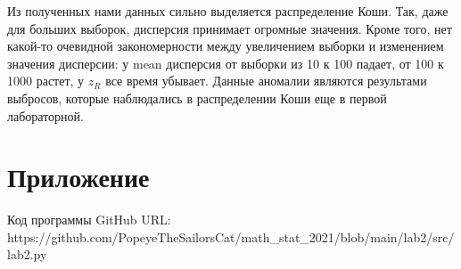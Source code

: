 \documentclass[a4paper]{article}
\begin{document}
Из полученных нами данных сильно выделяется распределение  Коши. Так, даже для больших выборок, дисперсия принимает огромные значения. Кроме того, нет какой-то очевидной закономерности между увеличением выборки и изменением значения дисперсии: у mean дисперсия от выборки из 10 к 100 падает, от 100 к 1000 растет, у $z_R$ все время убывает. Данные аномалии являются результами выбросов, которые наблюдались в распределении Коши еще в первой лабораторной.

\section {Приложение}
\noindent Код программы GitHub URL:\\
\newline https://github.com/PopeyeTheSailorsCat/math\_stat\_2021/blob/main/lab2/src/lab2.py
\end{document}
